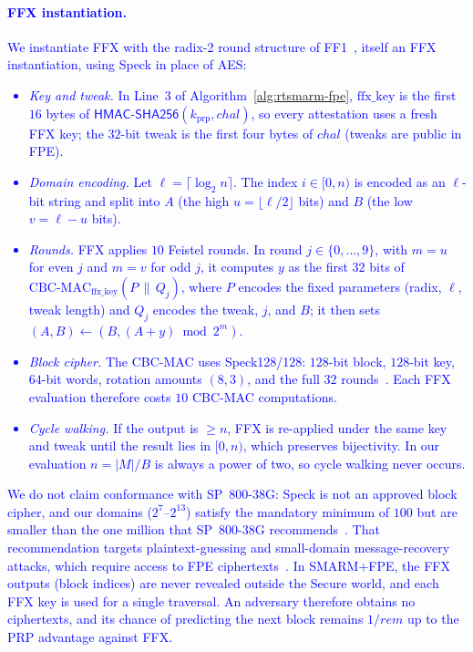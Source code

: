\documentclass[journal]{IEEEtran}
\newcommand\ben[1]{\textcolor{blue}{#1}}
\newcommand{\rtsmarmtwo}{SMARM+FPE\xspace}
\begin{document}
\paragraph{\ben{FFX instantiation.}}
\ben{We instantiate FFX with the radix-2 round structure of FF1~\cite{ff1}, itself an FFX instantiation, using Speck in place of AES:
\begin{itemize}
  \item \emph{Key and tweak.} In Line~3 of Algorithm~\ref{alg:rtsmarm-fpe}, $\text{ffx\_key}$ is the first $16$ bytes of $\mathsf{HMAC\text{-}SHA256}(k_{\mathrm{prp}}, chal)$, so every attestation uses a fresh FFX key; the $32$-bit tweak is the first four bytes of $chal$ (tweaks are public in FPE).
  \item \emph{Domain encoding.} Let $\ell = \lceil \log_2 n \rceil$. The index $i \in [0, n)$ is encoded as an $\ell$-bit string and split into $A$ (the high $u = \lfloor \ell/2 \rfloor$ bits) and $B$ (the low $v = \ell - u$ bits).
  \item \emph{Rounds.} FFX applies $10$ Feistel rounds. In round $j \in \{0,\dots,9\}$, with $m = u$ for even $j$ and $m = v$ for odd $j$, it computes $y$ as the first $32$ bits of $\mathrm{CBC\text{-}MAC}_{\text{ffx\_key}}(P \,\|\, Q_j)$, where $P$ encodes the fixed parameters (radix, $\ell$, tweak length) and $Q_j$ encodes the tweak, $j$, and $B$; it then sets $(A, B) \gets (B, (A + y) \bmod 2^m)$.
  \item \emph{Block cipher.} The CBC-MAC uses Speck128/128: $128$-bit block, $128$-bit key, $64$-bit words, rotation amounts $(8, 3)$, and the full $32$ rounds~\cite{speck}. Each FFX evaluation therefore costs $10$ CBC-MAC computations.
  \item \emph{Cycle walking.} If the output is $\ge n$, FFX is re-applied under the same key and tweak until the result lies in $[0, n)$, which preserves bijectivity. In our evaluation $n = |M|/B$ is always a power of two, so cycle walking never occurs.
\end{itemize}
We do not claim conformance with SP~800-38G: Speck is not an approved block cipher, and our domains ($2^{7}$--$2^{13}$) satisfy the mandatory minimum of $100$ but are smaller than the one million that SP~800-38G recommends~\cite{ff1}.
That recommendation targets plaintext-guessing and small-domain message-recovery attacks, which require access to FPE ciphertexts~\cite{hoang2018curse}.
In \rtsmarmtwo, the FFX outputs (block indices) are never revealed outside the Secure world, and each FFX key is used for a single traversal. An adversary therefore obtains no ciphertexts, and its chance of predicting the next block remains $1/rem$ up to the PRP advantage against FFX.}
\end{document}

